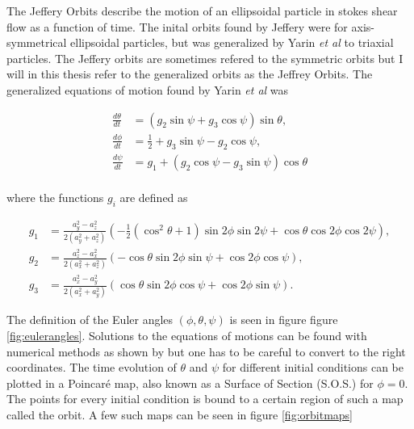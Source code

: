 The Jeffery Orbits describe the motion of an ellipsoidal particle in stokes shear flow as a function of time. The inital orbits found by Jeffery were for axis-symmetrical ellipsoidal particles, but was generalized by Yarin \emph{et al} \cite{Yarin} to triaxial particles. The Jeffery orbits are sometimes refered to the symmetric orbits but I will in this thesis refer to the generalized orbits as the Jeffrey Orbits. The generalized equations of motion found by Yarin \emph{et al} was

\begin{subequations}\label{eq:jeffrey}
\begin{align}
\frac{d\theta}{dt} 	&= (g_2 \sin \psi + g_3 \cos \psi ) \sin \theta, \\
\frac{d\phi}{dt} 	&= \tfrac{1}{2} + g_3\sin \psi - g_2 \cos \psi,\\
\frac{d\psi}{dt}	&= g_1 + (g_2\cos \psi - g_3\sin \psi) \cos \theta \\
\end{align}
\end{subequations}

where the functions  $g_i$ are defined as

\begin{subequations}
\begin{align}
g_1 &= \frac{a_y^2 - a_z^2}{2(a_y^2 + a_z^2)} 
		\left(-\tfrac{1}{2}(\cos^2 \theta + 1 )\sin 2\phi \sin 2\psi + \cos\theta \cos 2\phi \cos 2\psi \right), \\
g_2 &= \frac{a_z^2 - a_x^2}{2(a_x^2 + a_z^2)}
		\left( -\cos\theta \sin 2\phi \sin\psi  +  \cos 2\phi \cos\psi \right), \\
g_3 &= \frac{a_x^2 - a_y^2}{2(a_x^2 + a_y^2)}
		\left( \cos\theta \sin 2\phi \cos\psi + \cos 2\phi \sin\psi \right).
\end{align}
\end{subequations}

The definition of the Euler angles $(\phi, \theta, \psi)$ is seen in figure figure \ref{fig:eulerangles}. 
Solutions to the equations of motions can be found with numerical methods as shown by \cite{Yarin} but one has to be careful to convert to the right coordinates. 
The time evolution of $\theta$ and $\psi$ for different initial conditions can be plotted in a Poincaré map, also known 
as a Surface of Section (S.O.S.) \cite{poincare} for $\phi = 0$. The points for every initial condition is bound to a certain region of such a map called the orbit. A few such maps can be seen in figure \ref{fig:orbitmaps}

